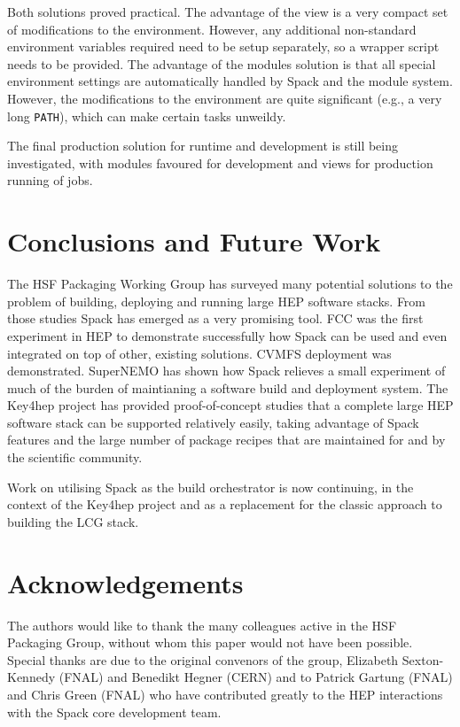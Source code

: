 \documentclass{webofc}
\begin{document}
Both solutions proved practical. The advantage of the view is a very compact
set of modifications to the environment. However, any additional non-standard
environment variables required need to be setup separately, so a wrapper script
needs to be provided. The advantage of the modules solution is that all special
environment settings are automatically handled by Spack and the module system.
However, the modifications to the environment are quite significant (e.g., a
very long \texttt{PATH}), which can make certain tasks unweildy.

The final production solution for runtime and development is still being
investigated, with modules favoured for development and views for production
running of jobs.

\section{Conclusions and Future Work}

The HSF Packaging Working Group has surveyed many potential solutions to the
problem of building, deploying and running large HEP software stacks. From
those studies Spack has emerged as a very promising tool. FCC was the first
experiment in HEP to demonstrate successfully how Spack can be used and even
integrated on top of other, existing solutions. CVMFS deployment was
demonstrated. SuperNEMO has shown how Spack relieves a small experiment of much
of the burden of maintianing a software build and deployment system. The
Key4hep project has provided proof-of-concept studies that a complete large
HEP software stack can be supported relatively easily, taking advantage
of Spack features and the large number of package recipes that are
maintained for and by the scientific community.

Work on utilising Spack as the build orchestrator is now continuing, in the
context of the Key4hep project and as a replacement for the classic approach
to building the LCG stack.

\section*{Acknowledgements}

The authors would like to thank the many colleagues active in the HSF
Packaging Group, without whom this paper would not have been possible.
Special thanks are due to the original convenors of the group,
Elizabeth Sexton-Kennedy (FNAL) and Benedikt Hegner (CERN) and to
Patrick Gartung (FNAL) and Chris Green (FNAL) who have contributed
greatly to the HEP interactions with the Spack core development team.

%

\end{document}
